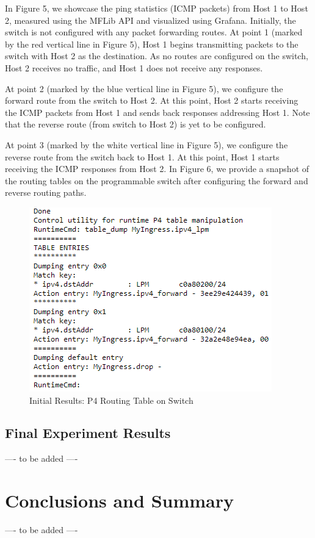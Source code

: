 \documentclass[conference]{IEEEtran}
\begin{document}
    In Figure 5, we showcase the ping statistics (ICMP packets) from Host 1 to Host 2, measured using the MFLib API and visualized using Grafana.
    Initially, the switch is not configured with any packet forwarding routes. At point 1 (marked by the red vertical line in Figure 5), Host 1 begins transmitting packets to the switch with Host 2 as the destination. As no routes are configured on the switch, Host 2 receives no traffic, and Host 1 does not receive any responses.

    At point 2 (marked by the blue vertical line in Figure 5), we configure the forward route from the switch to Host 2. At this point, Host 2 starts receiving the ICMP packets from Host 1 and sends back responses addressing Host 1. Note that the reverse route (from switch to Host 2) is yet to be configured.

    At point 3 (marked by the white vertical line in Figure 5), we configure the reverse route from the switch back to Host 1. At this point, Host 1 starts receiving the ICMP responses from Host 2. In Figure 6, we provide a snapshot of the routing tables on the programmable switch after configuring the forward and reverse routing paths.

    \begin{figure}[t]
        \includegraphics[scale=0.5]{Switch_Routing_Table.png}
        \centering
        \caption{Initial Results: P4 Routing Table on Switch}
    \end{figure}
        
    \subsection{Final Experiment Results}
    ---- to be added ----

    \section{Conclusions and Summary}
    ---- to be added ----
    
\end{document}
